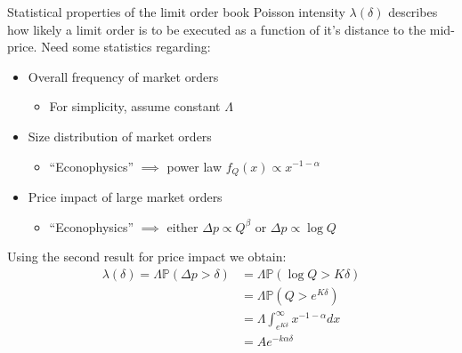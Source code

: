\documentclass{beamer} %
\begin{document}
\begin{frame}{Statistical properties of the limit order book}
    Poisson intensity $\lambda(\delta)$ describes how likely a limit order is to be executed as a function of it's 
    distance to the mid-price. Need some statistics regarding:
    \begin{itemize}
        \item Overall frequency of market orders
        \begin{itemize}
            \item For simplicity, assume constant $\Lambda$
        \end{itemize}
        \item Size distribution of market orders
        \begin{itemize}
            \item ``Econophysics'' $\implies$ power law $f_Q(x)\propto x^{-1-\alpha}$
        \end{itemize}
        \item Price impact of large market orders
        \begin{itemize}
            \item ``Econophysics'' $\implies$ either $\Delta p\propto Q^\beta$ or $\Delta p\propto\log Q$
        \end{itemize}
    \end{itemize}
    Using the second result for price impact we obtain:
    \begin{align*}
        \lambda(\delta)=\Lambda\mathbb{P}(\Delta p>\delta)&=\Lambda\mathbb{P}(\log Q>K\delta)\\
        &=\Lambda\mathbb{P}\left(Q>e^{K\delta}\right)\\
        &=\Lambda\int_{e^{K\delta}}^{\infty}x^{-1-\alpha}dx\\
        &=Ae^{-k\alpha\delta}
    \end{align*}
\end{frame}
\end{document}
